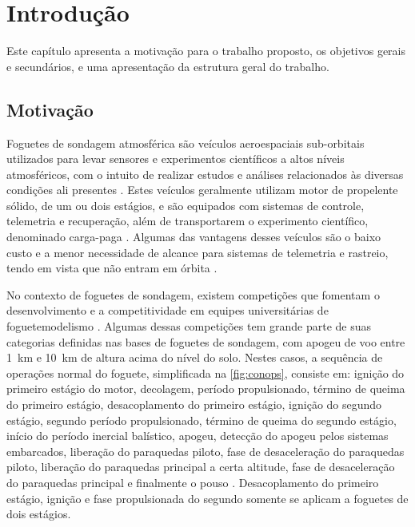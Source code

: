 \chapter{Introdução}

Este capítulo apresenta a motivação para o trabalho proposto, os objetivos gerais e secundários, e uma apresentação da estrutura geral do trabalho.

\section{Motivação}

Foguetes de sondagem atmosférica são veículos aeroespaciais sub-orbitais utilizados para levar sensores e experimentos científicos a altos níveis atmosféricos, com o intuito de realizar estudos e análises relacionados às diversas condições ali presentes \cite{isro}.
Estes veículos geralmente utilizam motor de propelente sólido, de um ou dois estágios, e são equipados com sistemas de controle, telemetria e recuperação, além de transportarem o experimento científico, denominado carga-paga \cite{esa, sabbatini2014esa}.
Algumas das vantagens desses veículos são o baixo custo e a menor necessidade de alcance para sistemas de telemetria e rastreio, tendo em vista que não entram em órbita \cite{nasa}.

No contexto de foguetes de sondagem, existem competições que fomentam o desenvolvimento e a competitividade em equipes universitárias de foguetemodelismo \cite{esra}.
Algumas dessas competições tem grande parte de suas categorias definidas nas bases de foguetes de sondagem, com apogeu de voo entre \SI{1}{\kilo\metre} e \SI{10}{\kilo\metre} de altura acima do nível do solo.
Nestes casos, a sequência de operações normal do foguete, simplificada na \autoref{fig:conops}, consiste em: ignição do primeiro estágio do motor, decolagem, período propulsionado, término de queima do primeiro estágio, desacoplamento do primeiro estágio, ignição do segundo estágio, segundo período propulsionado, término de queima do segundo estágio, início do período inercial balístico, apogeu, detecção do apogeu pelos sistemas embarcados, liberação do paraquedas piloto, fase de desaceleração do paraquedas piloto, liberação do paraquedas principal a certa altitude, fase de desaceleração do paraquedas principal e finalmente o pouso \cite{esa, sabbatini2014esa}.
Desacoplamento do primeiro estágio, ignição e fase propulsionada do segundo somente se aplicam a foguetes de dois estágios.

